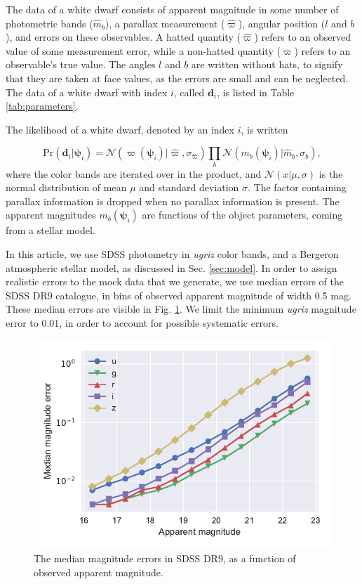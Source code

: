 \documentclass[fleqn,usenatbib]{mnras}
\newcommand{\objp}{\boldsymbol{\psi}}
\newcommand{\data}{\mathbf{d}}
\newcommand{\pr}{\text{Pr}}
\begin{document}
The data of a white dwarf consists of apparent magnitude in some number of photometric bands ($\hat{m}_b$), a parallax measurement ($\hat{\varpi}$), angular position ($l$ and $b$), and errors on these observables. A hatted quantity ($\hat{\varpi}$) refers to an observed value of some measurement error, while a non-hatted quantity ($\varpi$) refers to an observable's true value. The angles $l$ and $b$ are written without hats, to signify that they are taken at face values, as the errors are small and can be neglected. The data of a white dwarf with index $i$, called $\data_i$, is listed in Table \ref{tab:parameters}.

The likelihood of a white dwarf, denoted by an index $i$, is written

\begin{equation}\label{eq:likelihood}
	\pr(\data_i | \objp_i) = \mathcal{N}(\varpi(\objp_i)|\hat{\varpi},\sigma_{\hat{\varpi}})\prod_{b} \mathcal{N}(m_b(\objp_i)|\hat{m}_b,\sigma_b),
\end{equation}
where the color bands are iterated over in the product, and $\mathcal{N}(x | \mu,\sigma)$ is the normal distribution of mean $\mu$ and standard deviation $\sigma$. The factor containing parallax information is dropped when no parallax information is present. The apparent magnitudes $m_b(\objp_i)$ are functions of the object parameters, coming from a stellar model.

In this article, we use SDSS photometry in \emph{ugriz} color bands, and a Bergeron atmospheric stellar model, as discussed in Sec. \ref{sec:model}. In order to assign realistic errors to the mock data that we generate, we use median errors of the SDSS DR9 catalogue, in bins of observed apparent magnitude of width 0.5 mag. These median errors are visible in Fig. \ref{fig:magnitude_error}. We limit the minimum \emph{ugriz} magnitude error to 0.01, in order to account for possible systematic errors.

\begin{figure}
	\includegraphics[width=\columnwidth]{median_app_errors.pdf}
    \caption{The median magnitude errors in SDSS DR9, as a function of observed apparent magnitude.}
    \label{fig:magnitude_error}
\end{figure}
\end{document}
